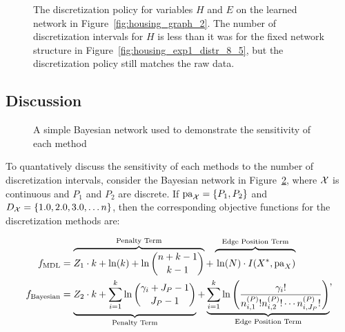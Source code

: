 \begin{figure}[ht]
  \centering
  
  \caption{
    The discretization policy for variables $H$ and $E$ on the learned network in Figure~\ref{fig:housing_graph_2}.
    The number of discretization intervals for $H$ is less than it was for the fixed network structure in Figure~\ref{fig:housing_exp1_distr_8_5}, but the discretization policy still matches the raw data.
  }
  \label{fig:housing_exp2_distr_8_5}
\end{figure}

\subsection{Discussion}
\label{subsec:discuss_exp}

\begin{figure}[ht]
  \centering
  
  \caption{A simple Bayesian network used to demonstrate the sensitivity of each method}
  \label{fig:exp_discuss}
\end{figure}

To quantatively discuss the sensitivity of each methods to the number of discretization intervals, consider the Bayesian network in Figure~\ref{fig:exp_discuss}, where $\mathcal{X}$ is continuous and $P_1$ and $P_2$ are discrete.
If $\Pa_{\cX} = \curly{P_1, P_2}$ and $D_{\cX} = \curly{1.0,2.0,3.0, \ldots n}$, then the corresponding objective functions for the discretization methods are:

\begin{small}
  \begin{equation}
  \begin{aligned}
  f_{\text{MDL}} & = \overbrace{Z_1 \cdot k + \ln(k) + \ln {{n +k - 1}\choose{k -1}} }^{\text{Penalty Term}}+   \overbrace{\rule{0pt}{1.35em} \ln(N) \cdot I(X^*, \Pa_X)}^{\text{Edge Position Term}} \\
  f_{\text{Bayesian}} &= \underbrace{{\vrule width0pt height0pt depth1.48em\relax}  Z_2 \cdot k + \sum_{i=1}^k \ln {{\gamma_i + J_P - 1}\choose{J_P -1}}}_{\text{Penalty Term}} + \underbrace{\sum^k_{i=1} \ln \left(   {{\gamma_i !}\over{n^{(P)}_{i,1}! n^{(P)}_{i,2}! \cdots n^{(P)}_{i,J_P}!    }} \right) }_{\text{Edge Position Term}}
  \end{aligned}\text{,}
  \end{equation}
\end{small}

